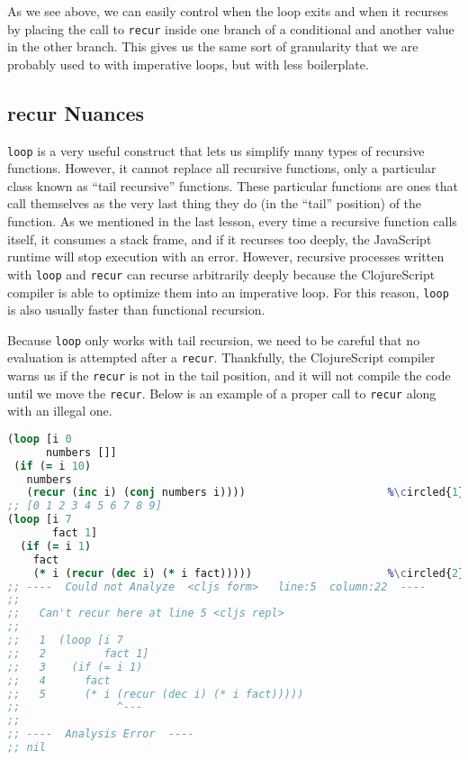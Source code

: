 \documentclass[10pt,twoside,openright]{memoir}
\newcommand*\circled[1]{\tikz[baseline=(char.base)]{
            \node[shape=circle,draw,inner sep=1pt] (char) {#1};}}
\begin{document}
As we see above, we can easily control when the loop exits and when it
recurses by placing the call to \texttt{recur} inside one branch of a
conditional and another value in the other branch. This gives us the
same sort of granularity that we are probably used to with imperative
loops, but with less boilerplate.


\subsection{recur Nuances}

\texttt{loop} is a very useful construct that lets us simplify many
types of recursive functions. However, it cannot replace all recursive
functions, only a particular class known as ``tail recursive''
functions. These particular functions are ones that call themselves as
the very last thing they do (in the ``tail'' position) of the function.
As we mentioned in the last lesson, every time a recursive function
calls itself, it consumes a stack frame, and if it recurses too deeply,
the JavaScript runtime will stop execution with an error. However,
recursive processes written with \texttt{loop} and \texttt{recur} can
recurse arbitrarily deeply because the ClojureScript compiler is able to
optimize them into an imperative loop. For this reason, \texttt{loop} is
also usually faster than functional recursion.

Because \texttt{loop} only works with tail recursion, we need to be
careful that no evaluation is attempted after a \texttt{recur}.
Thankfully, the ClojureScript compiler warns us if the \texttt{recur} is
not in the tail position, and it will not compile the code until we move
the \texttt{recur}. Below is an example of a proper call to
\texttt{recur} along with an illegal one.

\begin{lstlisting}[language=Clojure, caption={Legal and illegal \texttt{recur}}]
(loop [i 0
      numbers []]
 (if (= i 10)
   numbers
   (recur (inc i) (conj numbers i))))                      %\circled{1}%
;; [0 1 2 3 4 5 6 7 8 9]
(loop [i 7
       fact 1]
  (if (= i 1)
    fact
    (* i (recur (dec i) (* i fact)))))                     %\circled{2}%
;; ----  Could not Analyze  <cljs form>   line:5  column:22  ----
;;
;;   Can't recur here at line 5 <cljs repl>
;;
;;   1  (loop [i 7
;;   2         fact 1]
;;   3    (if (= i 1)
;;   4      fact
;;   5      (* i (recur (dec i) (* i fact)))))
;;               ^---
;;
;; ----  Analysis Error  ----
;; nil
\end{lstlisting}
\end{document}
